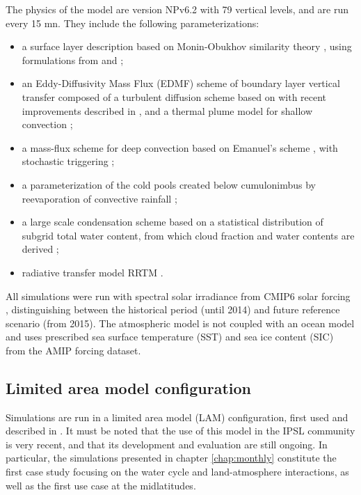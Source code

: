 The physics of the model are version NPv6.2 with 79 vertical levels, and are run every 15 mn.
They include the following parameterizations:
\begin{itemize}
    \item a surface layer description based on Monin-Obukhov similarity theory \citep{monin1954osnovnye}, using formulations from \cite{louis_parametric_1979} and \cite{king_sensitivity_2001}; 
    \item an Eddy-Diffusivity Mass Flux (EDMF) scheme of boundary layer vertical transfer composed of a turbulent diffusion scheme based on \cite{yamada_simulations_1983} with recent improvements described in \cite{vignon_modeling_2018}, and a thermal plume model for shallow convection \citep{rio_thermal_2008, hourdin_unified_2019}; 
    \item a mass-flux scheme for deep convection based on Emanuel's scheme \citep{emanuel_scheme_1991, grandpeix_improved_2004, rio_control_2013}, with stochastic triggering \citep{rochetin_deep_2014, rochetin_deep_2014-1}; 
    \item a parameterization of the cold pools created below cumulonimbus by reevaporation of convective rainfall \citep{grandpeix_density_2010-1,grandpeix_density_2010};
    \item a large scale condensation scheme based on a statistical distribution of subgrid total water content, from which cloud fraction and water contents are derived \citep{madeleine_improved_2020}; 
    \item radiative transfer model RRTM \citep{mlawer_radiative_1997}.
\end{itemize}

All simulations were run with spectral solar irradiance from CMIP6 solar forcing \citep{matthes_solar_2017}, distinguishing between the historical period (until 2014) and future reference scenario (from 2015).
The atmospheric model is not coupled with an ocean model and uses prescribed sea surface temperature (SST) and sea ice content (SIC) from the AMIP forcing dataset.

\subsection{Limited area model configuration}
Simulations are run in a limited area model (LAM) configuration, first used and described in \citet{raillard_leveraging_2024}. It must be noted that the use of this model in the IPSL community is very recent, and that its development and evaluation are still ongoing. In particular, the simulations presented in chapter \ref{chap:monthly} constitute the first case study focusing on the water cycle and land-atmosphere interactions, as well as the first use case at the midlatitudes.

